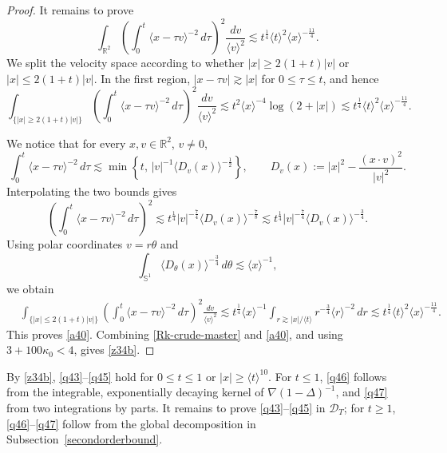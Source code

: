 \documentclass[reqno,11pt]{amsart}
\numberwithin{equation}{section}
\def\R{{\mathbb R}}
\def\R{{\bf R}}
\def\R{\mathbb{R}}
\begin{document}
\begin{proof}
	It remains to prove
	\begin{equation}\label{a40}
	\int_{\mathbb R^2}
	\left(
	\int_0^t\langle x-\tau v\rangle^{-2}\,d\tau
	\right)^2
	\frac{dv}{\langle v\rangle^2}
	\lesssim
	t^{\frac14}\langle t\rangle^2\langle x\rangle^{-\frac{11}{4}}.
	\end{equation}
	We split the velocity space according to whether
	$|x|\geq2(1+t)|v|$ or $|x|\leq2(1+t)|v|$. In the first region,
	$|x-\tau v|\gtrsim|x|$ for $0\leq\tau\leq t$, and hence
	\[
	\int_{\{|x|\geq2(1+t)|v|\}}
	\left(
	\int_0^t\langle x-\tau v\rangle^{-2}\,d\tau
	\right)^2
	\frac{dv}{\langle v\rangle^2}
	\lesssim
	t^2\langle x\rangle^{-4}\log(2+|x|)
	\lesssim
	t^{\frac14}\langle t\rangle^2
	\langle x\rangle^{-\frac{11}{4}}.
	\]

	We notice that for every $x,v\in\R^2$, $v\neq0$,
	\begin{equation}\label{a40.1}
	\int_0^t\langle x-\tau v\rangle^{-2}\,d\tau
	\lesssim
	\min\left\{t,\,
	|v|^{-1}\langle D_v(x)\rangle^{-\frac12}\right\},\qquad
	D_v(x):=|x|^2-\frac{(x\cdot v)^2}{|v|^2}.
	\end{equation}
	Interpolating the two bounds gives
	\[
	\left(
	\int_0^t\langle x-\tau v\rangle^{-2}\,d\tau
	\right)^2
	\lesssim
	t^{\frac14}|v|^{-\frac74}
	\langle D_v(x)\rangle^{-\frac78}
	\lesssim
	t^{\frac14}|v|^{-\frac74}
	\langle D_v(x)\rangle^{-\frac34}.
	\]
	Using polar coordinates $v=r\theta$ and
	\begin{equation}\label{a40.2}
	\int_{\mathbb S^1}
	\langle D_\theta(x)\rangle^{-\frac34}\,d\theta
	\lesssim\langle x\rangle^{-1},
	\end{equation}
	we obtain
	\begin{align*}
	&\int_{\{|x|\leq2(1+t)|v|\}}
	\left(
	\int_0^t\langle x-\tau v\rangle^{-2}\,d\tau
	\right)^2
	\frac{dv}{\langle v\rangle^2}\lesssim
	t^{\frac14}\langle x\rangle^{-1}
	\int_{r\gtrsim |x|/\langle t\rangle}
	r^{-\frac34}\langle r\rangle^{-2}\,dr
	\lesssim
	t^{\frac14}\langle t\rangle^2
	\langle x\rangle^{-\frac{11}{4}}.
	\end{align*}
	This proves \eqref{a40}. Combining \eqref{Rk-crude-master} and
	\eqref{a40}, and using $3+100\kappa_0<4$, gives \eqref{z34b}.
\end{proof}

By \eqref{z34b}, \eqref{q43}--\eqref{q45} hold for
$0\leq t\leq1$ or $|x|\geq\langle t\rangle^{10}$.
For $t\leq1$, \eqref{q46} follows from the integrable, exponentially
decaying kernel of $\nabla(1-\Delta)^{-1}$, and \eqref{q47}
from two integrations by parts.
It remains to prove \eqref{q43}--\eqref{q45} in $\mathcal D_T$;
for $t\geq1$, \eqref{q46}--\eqref{q47} follow from the global
decomposition in Subsection~\ref{secondorderbound}.
\end{document}
